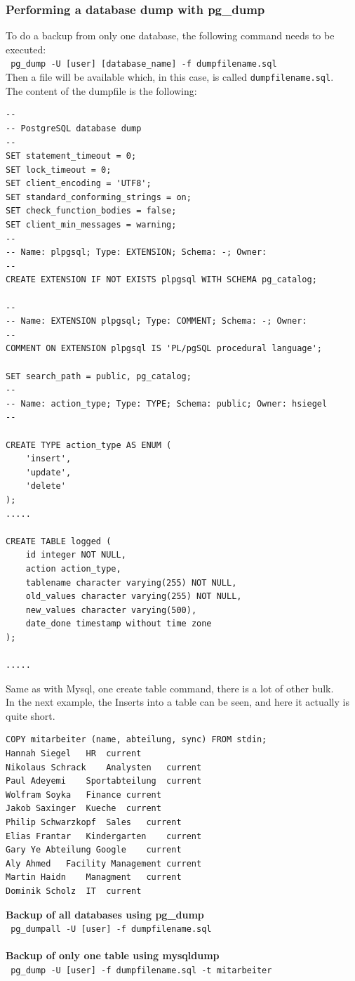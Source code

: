 \documentclass[10pt]{article}
\begin{document}
\subsubsection{Performing a database dump with pg\_dump \cite{pgdumpdoc}}
To do a backup from only one database, the following command needs to be executed: \\
\texttt{ pg\_dump -U [user] [database\_name] -f dumpfilename.sql } \\
Then a file will be available which, in this case, is called \texttt{dumpfilename.sql}.\\ 
The content of the dumpfile is the following:
\begin{lstlisting}    
--
-- PostgreSQL database dump
--
SET statement_timeout = 0;
SET lock_timeout = 0;
SET client_encoding = 'UTF8';
SET standard_conforming_strings = on;
SET check_function_bodies = false;
SET client_min_messages = warning;
--
-- Name: plpgsql; Type: EXTENSION; Schema: -; Owner: 
--
CREATE EXTENSION IF NOT EXISTS plpgsql WITH SCHEMA pg_catalog;

--
-- Name: EXTENSION plpgsql; Type: COMMENT; Schema: -; Owner: 
--
COMMENT ON EXTENSION plpgsql IS 'PL/pgSQL procedural language';

SET search_path = public, pg_catalog;
--
-- Name: action_type; Type: TYPE; Schema: public; Owner: hsiegel
--

CREATE TYPE action_type AS ENUM (
    'insert',
    'update',
    'delete'
);
.....

CREATE TABLE logged (
    id integer NOT NULL,
    action action_type,
    tablename character varying(255) NOT NULL,
    old_values character varying(255) NOT NULL,
    new_values character varying(500),
    date_done timestamp without time zone
);

.....
\end{lstlisting}    
Same as with Mysql, one create table command, there is a lot of other bulk. \\
In the next example, the Inserts into a table can be seen, and here it actually is quite short.
\begin{lstlisting}    
COPY mitarbeiter (name, abteilung, sync) FROM stdin;
Hannah Siegel	HR	current
Nikolaus Schrack	Analysten	current
Paul Adeyemi	Sportabteilung	current
Wolfram Soyka	Finance	current
Jakob Saxinger	Kueche	current
Philip Schwarzkopf	Sales	current
Elias Frantar	Kindergarten	current
Gary Ye	Abteilung Google	current
Aly Ahmed	Facility Management	current
Martin Haidn	Managment	current
Dominik Scholz	IT	current
\end{lstlisting}    
\textbf{Backup of all databases using pg\_dump}\\
\texttt{ pg\_dumpall -U [user] -f dumpfilename.sql} \\ \\
\textbf{Backup of only one table using mysqldump}\\
\texttt{ pg\_dump -U [user] -f dumpfilename.sql -t mitarbeiter} 
\end{document}
